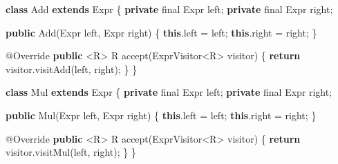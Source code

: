 \documentclass[]{article}
\newenvironment{Shaded}{}{}
\newcommand{\AttributeTok}[1]{\textcolor[rgb]{0.49,0.56,0.16}{#1}}
\newcommand{\ControlFlowTok}[1]{\textcolor[rgb]{0.00,0.44,0.13}{\textbf{#1}}}
\newcommand{\DataTypeTok}[1]{\textcolor[rgb]{0.56,0.13,0.00}{#1}}
\newcommand{\FunctionTok}[1]{\textcolor[rgb]{0.02,0.16,0.49}{#1}}
\newcommand{\KeywordTok}[1]{\textcolor[rgb]{0.00,0.44,0.13}{\textbf{#1}}}
\newcommand{\NormalTok}[1]{#1}
\newcommand{\OperatorTok}[1]{\textcolor[rgb]{0.40,0.40,0.40}{#1}}
\begin{document}
\begin{Shaded}
\begin{Highlighting}[]
\KeywordTok{class}\NormalTok{ Add }\KeywordTok{extends}\NormalTok{ Expr }\OperatorTok{\{}
    \KeywordTok{private} \DataTypeTok{final}\NormalTok{ Expr left}\OperatorTok{;}
    \KeywordTok{private} \DataTypeTok{final}\NormalTok{ Expr right}\OperatorTok{;}

    \KeywordTok{public} \FunctionTok{Add}\OperatorTok{(}\NormalTok{Expr left}\OperatorTok{,}\NormalTok{ Expr right}\OperatorTok{)} \OperatorTok{\{}
        \KeywordTok{this}\OperatorTok{.}\FunctionTok{left} \OperatorTok{=}\NormalTok{ left}\OperatorTok{;}
        \KeywordTok{this}\OperatorTok{.}\FunctionTok{right} \OperatorTok{=}\NormalTok{ right}\OperatorTok{;}
    \OperatorTok{\}}

    \AttributeTok{@Override}
    \KeywordTok{public} \OperatorTok{\textless{}}\NormalTok{R}\OperatorTok{\textgreater{}}\NormalTok{ R }\FunctionTok{accept}\OperatorTok{(}\NormalTok{ExprVisitor}\OperatorTok{\textless{}}\NormalTok{R}\OperatorTok{\textgreater{}}\NormalTok{ visitor}\OperatorTok{)} \OperatorTok{\{}
        \ControlFlowTok{return}\NormalTok{ visitor}\OperatorTok{.}\FunctionTok{visitAdd}\OperatorTok{(}\NormalTok{left}\OperatorTok{,}\NormalTok{ right}\OperatorTok{);}
    \OperatorTok{\}}
\OperatorTok{\}}

\KeywordTok{class}\NormalTok{ Mul }\KeywordTok{extends}\NormalTok{ Expr }\OperatorTok{\{}
    \KeywordTok{private} \DataTypeTok{final}\NormalTok{ Expr left}\OperatorTok{;}
    \KeywordTok{private} \DataTypeTok{final}\NormalTok{ Expr right}\OperatorTok{;}

    \KeywordTok{public} \FunctionTok{Mul}\OperatorTok{(}\NormalTok{Expr left}\OperatorTok{,}\NormalTok{ Expr right}\OperatorTok{)} \OperatorTok{\{}
        \KeywordTok{this}\OperatorTok{.}\FunctionTok{left} \OperatorTok{=}\NormalTok{ left}\OperatorTok{;}
        \KeywordTok{this}\OperatorTok{.}\FunctionTok{right} \OperatorTok{=}\NormalTok{ right}\OperatorTok{;}
    \OperatorTok{\}}

    \AttributeTok{@Override}
    \KeywordTok{public} \OperatorTok{\textless{}}\NormalTok{R}\OperatorTok{\textgreater{}}\NormalTok{ R }\FunctionTok{accept}\OperatorTok{(}\NormalTok{ExprVisitor}\OperatorTok{\textless{}}\NormalTok{R}\OperatorTok{\textgreater{}}\NormalTok{ visitor}\OperatorTok{)} \OperatorTok{\{}
        \ControlFlowTok{return}\NormalTok{ visitor}\OperatorTok{.}\FunctionTok{visitMul}\OperatorTok{(}\NormalTok{left}\OperatorTok{,}\NormalTok{ right}\OperatorTok{);}
    \OperatorTok{\}}
\OperatorTok{\}}
\end{Highlighting}
\end{Shaded}
\end{document}
